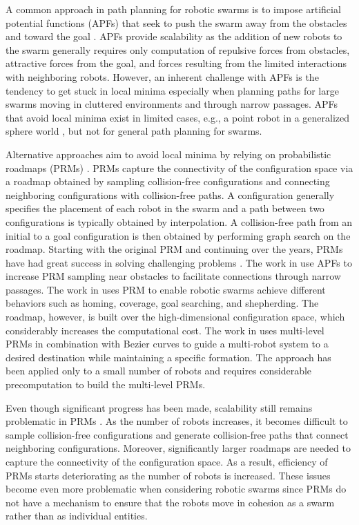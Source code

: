A common approach in path planning for robotic swarms is to impose
artificial potential functions (APFs) that seek to push the swarm away
from the obstacles and toward the goal
\cite{Khatib86,reif1999social,book:SwarmsAPFs,tanner2005formation}. APFs
provide scalability as the addition of new robots to the swarm
generally requires only computation of repulsive forces from
obstacles, attractive forces from the goal, and forces resulting from
the limited interactions with neighboring robots.  However, an
inherent challenge with APFs is the tendency to get stuck in local
minima especially when planning paths for large swarms moving in
cluttered environments and through narrow passages.  APFs that avoid
local minima exist in limited cases, e.g., a point robot in a
generalized sphere world \cite{RK92}, but not for general path
planning for swarms.
 
Alternative approaches aim to avoid local minima by relying on
probabilistic roadmaps (PRMs) \cite{PRM}. PRMs capture the
connectivity of the configuration space via a roadmap obtained by
sampling collision-free configurations and connecting neighboring
configurations with collision-free paths. A configuration generally
specifies the placement of each robot in the swarm and a path between
two configurations is typically obtained by interpolation.  A
collision-free path from an initial to a goal configuration is then
obtained by performing graph search on the roadmap.  Starting with the
original PRM \cite{PRM} and continuing over the years, PRMs have had
great success in solving challenging problems
\cite{TogglePRM,UOBPRM,PlakuTRO05,HSUBridge,GaussianPRM,manocha12}.
The work in \cite{PRMapf1,PRMapf2} use APFs to increase PRM sampling
near obstacles to facilitate connections through narrow passages.  The
work in \cite{LienSwarming,LienSwarmingRules,LienShepherding} uses PRM
to enable robotic swarms achieve different behaviors such as homing,
coverage, goal searching, and shepherding. The roadmap, however, is
built over the high-dimensional configuration space, which
considerably increases the computational cost. The work in
\cite{KostasSwarm} uses multi-level PRMs in combination with Bezier
curves to guide a multi-robot system to a desired destination while
maintaining a specific formation. The approach has been applied only
to a small number of robots and requires considerable precomputation
to build the multi-level PRMs.


Even though significant progress has been made, scalability still
remains problematic in PRMs \cite{book:MP,book:LaValle}. As the number
of robots increases, it becomes difficult to sample collision-free
configurations and generate collision-free paths that connect
neighboring configurations. Moreover, significantly larger roadmaps
are needed to capture the connectivity of the configuration space.  As
a result, efficiency of PRMs starts deteriorating as the number of
robots is increased. These issues become even more problematic when
considering robotic swarms since PRMs do not have a mechanism to
ensure that the robots move in cohesion as a swarm rather than as
individual entities.


